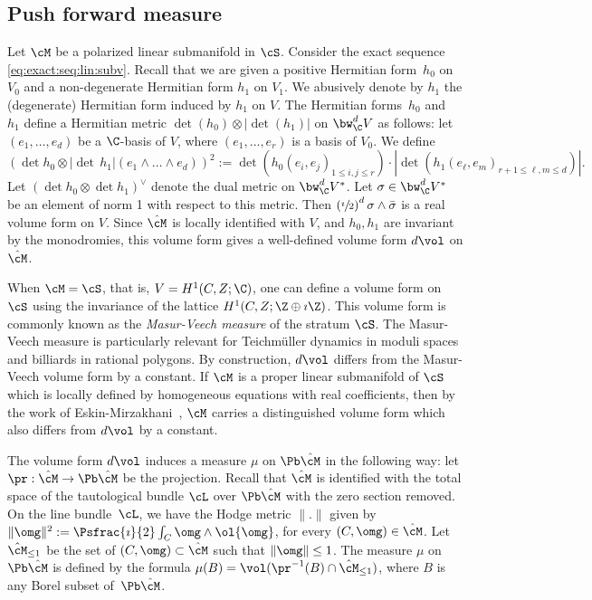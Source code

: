 \subsection{Push forward measure}\label{sec:push:measure}
Let $\cM$ be a polarized linear submanifold in $\cS$.
Consider the exact sequence \eqref{eq:exact:seq:lin:subv}.
Recall that we are given a positive Hermitian form~$h_0$ on $V_0$ and a non-degenerate Hermitian form $h_1$ on $V_1$. We abusively denote by $h_1$ the (degenerate) Hermitian form induced by $h_1$ on $V$.
The Hermitian forms~$h_0$ and~$h_1$ define a Hermitian metric $\det(h_0)\otimes|{\det}(h_1)|$ on $\bw^d_\C V$ as follows: let $(e_1,\dots,e_d)$ be a $\C$-basis of $V$, where $(e_1,\dots,e_r)$ is a basis of $V_0$. We define
\[
(\det h_0\otimes|{\det\,} h_1|(e_1\wedge\dots\wedge e_d))^2:=\det(h_0(e_i,e_j)_{1\leq i,j\leq r})\cdot|{\det}(h_1(e_\ell,e_m)_{r+1\leq \ell,m\leq d})|.
\]
Let $(\det h_0\otimes \det h_1)^\vee$ denote the dual metric on $\bw^d_\C V^*$.
Let $\sigma \in \bw^d_\C V^*$ be an element of norm 1 with respect to this metric.
Then $\left(\sfrac{\imath}{2}\right)^d\sigma\wedge\bar{\sigma}$ is a real volume form on $V$.
Since $\hat{\cM}$ is locally identified with $V$, and $h_0,h_1$ are invariant by the monodromies, this volume form gives a well-defined volume form $d\vol$ on $\hat{\cM}$.

When $\cM=\cS$, that is, $V=H^1(C,Z;\C)$, one can define a volume form on $\cS$ using the invariance of the lattice $H^1(C,Z;\Z\oplus\imath\Z)$.
This volume form is commonly known as the \emph{Masur-Veech measure} of the stratum $\cS$.
The Masur-Veech measure is particularly relevant for Teichmüller dynamics in moduli spaces and billiards in rational polygons.
By construction, $d\vol$ differs from the Masur-Veech volume form by a constant.
If $\cM$ is a proper linear submanifold of $\cS$ which is locally defined by homogeneous equations with real coefficients, then by the work of Eskin-Mirzakhani~\cite{EM18}, $\cM$ carries a distinguished volume form which also differs from $d\vol$ by a constant.

The volume form $d\vol$ induces a measure $\mu$ on $\Pb\hat\cM$ in the following way: let $\pr:\hat\cM\to\Pb\hat\cM$ be the projection.
Recall that $\hat\cM$ is identified with the total space of the tautological bundle $\cL$ over $\Pb\hat\cM$ with the zero section removed. On the line bundle~$\cL$, we have the Hodge metric $\|.\|$ given by $ \|\omg\|^2:=\Psfrac{\imath}{2}\int_C\omg\wedge\ol{\omg}$, for every $(C,\omg) \in \hat{\cM}$.
Let $\hat\cM_{\leq 1}$ be the set of $(C,\omg) \subset\hat\cM$ such that $\|\omg\| \leq 1$.
The measure $\mu$ on $\Pb\hat\cM$ is defined by the formula $\mu(B)=\vol(\pr^{-1}(B)\cap \hat\cM_{\leq 1})$, where $B$ is any Borel subset of~$\Pb\hat\cM$.

